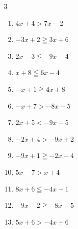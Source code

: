\begin{multicols}{3}
\begin{enumerate}

  \item $4x+4>7x-2$

        \phantom{$\displaystyle x<2$}

  \item $-3x+2\geqq 3x+6$


  \item $2x-3\leqq -9x-4$


  \item $x+8\leqq 6x-4$


  \item $-x+1\geqq 4x+8$


  \item $-x+7>-8x-5$


  \item $2x+5<-9x-5$


  \item $-2x+4>-9x+2$


  \item $-9x+1\geqq -2x-4$


  \item $5x-7>x+4$


  \item $8x+6\leqq -4x-1$


\columnbreak %

\resetques

  \item $-9x-2\geqq -8x-5$

        \phantom{$\displaystyle x\leqq 3$}

  \item $5x+6>-4x+6$


\end{enumerate}
\end{multicols}
